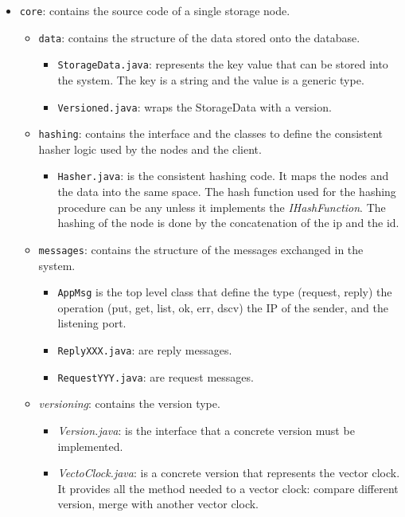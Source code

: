 \begin{itemize}
\item \texttt{core}: contains the source code of a single storage node.
\begin{itemize}
\item \texttt{data}: contains the structure of the data stored onto the database.
 \begin{itemize}
 \item \texttt{StorageData.java}: represents the key value that can be stored into the system. The key is a string and the value is a generic type.
 \item \texttt{Versioned.java}: wraps the StorageData with a version.
 \end{itemize}
\item \texttt{hashing}: contains the interface and the classes to define the consistent hasher logic used by the nodes and the client.
\begin{itemize}
\item \texttt{Hasher.java}: is the consistent hashing code. It maps the nodes and the data into the same space. The hash function used for the hashing procedure can be any unless it implements the \textit{IHashFunction}. The hashing of the node is done by the concatenation of the ip and the id.
\end{itemize}
\item \texttt{messages}: contains the structure of the messages exchanged in the system.
\begin{itemize}
\item \texttt{AppMsg} is the top level class that define  the type (request, reply) the operation (put, get, list, ok, err, dscv) the IP of the sender, and the listening port.
\item \texttt{ReplyXXX.java}: are reply messages. 
\item \texttt{RequestYYY.java}: are request messages.
\end{itemize}
\item \textit{versioning}: contains the version type.
\begin{itemize}
\item \textit{Version.java}: is the interface that a concrete version must be implemented.
\item \textit{VectoClock.java}: is a concrete version that represents the vector clock. It provides all the method needed to a vector clock: compare different version, merge with another vector clock.
\end{itemize}
\end{itemize}
\end{itemize}



